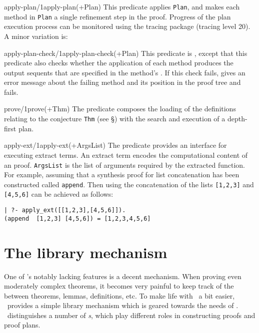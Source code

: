 \begin{predicate}{apply-plan/1}{apply-plan(+Plan)}%
This predicate applies {\tt Plan}, and makes each method in {\tt Plan}
a single refinement step in the proof. Progress of the plan execution
process can be monitored using the tracing package (tracing
level 20). A minor variation is:
\end{predicate}

\begin{predicate}{apply-plan-check/1}{apply-plan-check(+Plan)}%
This predicate is , except that this predicate also
checks whether the application of each method produces the output
sequents that are specified in the method's . If this
check fails, 
 gives an error message about the failing method
and its position in the proof tree and fails. 
\end{predicate}

\begin{predicate}{prove/1}{prove(+Thm)}%
The  predicate composes the loading of the 
definitions relating to the conjecture {\tt Thm} 
(see \S{}) with the search and execution of
a depth-first plan. 
\end{predicate}

\begin{predicate}{apply-ext/1}{apply-ext(+ArgsList)}%
The predicate  provides an interface for
executing extract terms. An \oyster extract term encodes
the computational content of an \oyster proof. {\tt ArgsList}
is the list of arguments required by the extracted function.
For example, assuming that a synthesis proof for list
concatenation has been constructed called {\tt append}. Then
using  the concatenation of the lists
{\tt [1,2,3]} and {\tt [4,5,6]} can be achieved as follows:
\begin{verbatim}
| ?- apply_ext([[1,2,3],[4,5,6]]).
(append  [1,2,3] [4,5,6]) = [1,2,3,4,5,6]
\end{verbatim}
\end{predicate}

\section {The library mechanism}
\label{library}

One of \oyster's notably lacking features is a decent 
mechanism. When proving even moderately complex theorems, it becomes
very painful to keep track of the  between theorems,
lemmas, definitions, etc. To make life with \clam\ a bit easier,
\clam\ provides a simple library mechanism which is geared towards the
needs of \clam. \clam\ distinguishes a number of {\em {}s}, which play different roles in constructing proofs and proof
plans.


